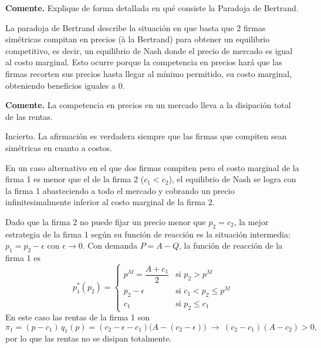 \question \textbf{Comente.} Explique de forma detallada en qué consiste la Paradoja de Bertrand.
\begin{solution}
La paradoja de Bertrand describe la situación en que basta que 2 firmas simétricas compitan en precios (à la Bertrand) para obtener un equilibrio competitivo, es decir, un equilibrio de Nash donde el precio de mercado es igual al costo marginal. Esto ocurre porque la competencia en precios hará que las firmas recorten sus precios hasta llegar al mínimo permitido, su costo marginal, obteniendo beneficios iguales a 0.

\end{solution}

\question \textbf{Comente.} La competencia en precios en un mercado lleva a la disipación total de las rentas.
\begin{solution}
Incierto. La afirmación es verdadera siempre que las firmas que compiten sean simétricas en cuanto a costos.

En un caso alternativo en el que dos firmas compiten pero el costo marginal de la firma 1 es menor que el de la firma 2 ($c_1<c_2$), el equilibrio de Nash se logra con la firma 1 abasteciendo a todo el mercado y cobrando un precio infinitesimalmente inferior al costo marginal de la firma 2.

Dado que la firma 2 no puede fijar un precio menor que $p_2 = c_2$, la mejor estrategia de la firma 1 según su función de reacción es la situación intermedia: $p_1 = p_2 - \epsilon$ con $\epsilon\to 0$. Con demanda $P = A - Q$, la función de reacción de la firma 1 es
\[
  p_1^*(p_2) =
  \begin{cases}
    p^M = \dfrac{A + c_1}{2} & \text{si } p_2 > p^M \\[2mm]
    p_2 - \epsilon & \text{si } c_1 < p_2 \leq p^M \\[1mm]
    c_1 & \text{si } p_2 \leq c_1
  \end{cases}
\]
En este caso las rentas de la firma 1 son
\[
  \pi_1 = (p - c_1)\,q_1(p) = (c_2 - \epsilon - c_1)\bigl(A - (c_2 - \epsilon)\bigr)
  \;\longrightarrow\; (c_2 - c_1)(A - c_2) > 0 ,
\]
por lo que las rentas no se disipan totalmente.

\end{solution}

